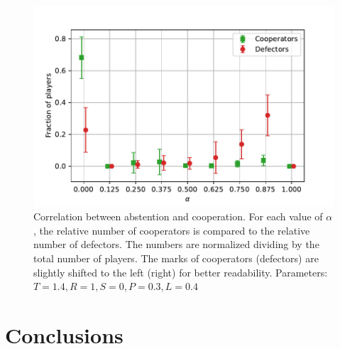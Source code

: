 \documentclass[12pt,oneside,a4paper,fleqn]{article}
\begin{document}
\begin{figure}
    \centering
    \includegraphics{Images/alpha.pdf}
    \caption{Correlation between abstention and cooperation. For each value of $\alpha$, the relative number of cooperators is compared to the relative number of defectors. The numbers are normalized dividing by the total number of players. The marks of cooperators (defectors) are slightly shifted to the left (right) for better readability. Parameters: $T = 1.4, R = 1, S = 0, P = 0.3, L = 0.4$}
    \label{fig:enter-label}
\end{figure}

\section{Conclusions}


%
%    
%    

\newpage

\printbibliography
\end{document}

